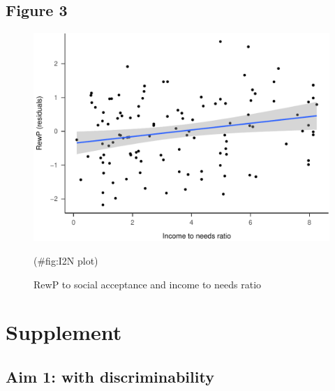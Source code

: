 \documentclass[english,man,floatsintext]{apa6}
\begin{document}
\hypertarget{figure-3}{%
\subsection{Figure 3}\label{figure-3}}

\begin{figure}

{\centering \includegraphics[width=1\linewidth]{DISS_tablesfigures_files/figure-latex/I2N plot-1} 

}

\caption{RewP to social acceptance and income to needs ratio}(\#fig:I2N plot)
\end{figure}

\newpage

\hypertarget{supplement}{%
\section{Supplement}\label{supplement}}

\hypertarget{aim-1-with-discriminability}{%
\subsection{Aim 1: with discriminability}\label{aim-1-with-discriminability}}
\end{document}
